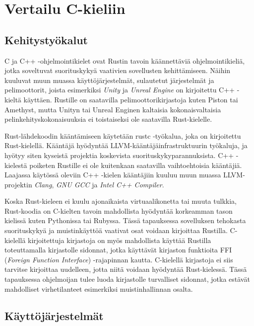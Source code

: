 \documentclass[finnish]{tktltiki2}
\theoremstyle{definition}
\theoremstyle{remark}
\begin{document}
\section{Vertailu C-kieliin}

\subsection{Kehitystyökalut}

C ja C++ -ohjelmointikielet ovat Rustin tavoin käännettäviä ohjelmointikieliä, jotka soveltuvat suorituskykyä vaativien sovellusten kehittämiseen. Näihin kuuluvat muun muassa käyttöjärjestelmät, sulautetut järjestelmät ja pelimoottorit, joista esimerkiksi \textit{Unity} ja \textit{Unreal Engine} on kirjoitettu C++ -kieltä käyttäen. Rustille on saatavilla pelimoottorikirjastoja kuten Piston tai Amethyst, mutta Unityn tai Unreal Enginen kaltaisia kokonaisvaltaisia pelinkehityskokonaisuuksia ei toistaiseksi ole saatavilla Rust-kielelle.\cite{AreWeGameYetEngines}

Rust-lähdekoodin kääntämiseen käytetään rustc -työkalua, joka on kirjoitettu Rust-kielellä. Kääntäjä hyödyntää LLVM-kääntäjäinfrastruktuurin työkaluja, ja hyötyy siten kyseistä projektia koskevista suorituskykyparannuksista. \cite{RustFaq} C++ -kielestä poiketen Rustille ei ole kuitenkaan saatavilla vaihtoehtoisia kääntäjiä. Laajassa käytössä oleviin C++ -kielen kääntäjiin kuuluu muun muassa LLVM-projektin \textit{Clang}, \textit{GNU GCC} ja \textit{Intel C++ Compiler}.

Koska Rust-kieleen ei kuulu ajonaikaista virtuaalikonetta tai muuta tulkkia, Rust-koodia on C-kielten tavoin mahdollista hyödyntää korkeamman tason kielissä kuten Pythonissa tai Rubyssa. Tässä tapauksessa sovelluksen tehokasta suorituskykyä ja muistinkäyttöä vaativat osat voidaan kirjoittaa Rustilla.\cite{RustInsideOtherLanguages} C-kielellä kirjoitettuja kirjastoja on myös mahdollista käyttää Rustilla toteuttamalla kirjastolle sidonnat, jotka käyttävät kirjaston funktioita FFI (\textit{Foreign Function Interface}) -rajapinnan kautta. C-kielellä kirjastoja ei siis tarvitse kirjoittaa uudelleen, jotta niitä voidaan hyödyntää Rust-kielessä. Tässä tapauksessa ohjelmoijan tulee luoda kirjastolle turvalliset sidonnat, jotka estävät mahdolliset virhetilanteet esimerkiksi muistinhallinnan osalta.

\subsection{Käyttöjärjestelmät}
\end{document}

